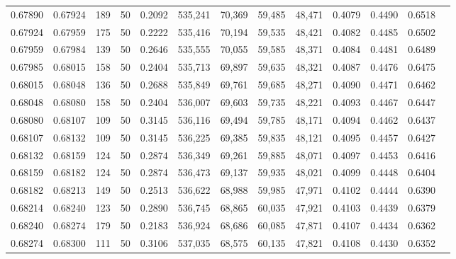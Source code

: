 \begin{tabular}{rrrrrrrrrrrrr}
0.67890 & 0.67924 &   189 &  50 &                                     0.2092 & 535,241 &  70,369 &  59,485 &  48,471 & 0.4079 & 0.4490 & 0.6518 \\
0.67924 & 0.67959 &   175 &  50 &                                     0.2222 & 535,416 &  70,194 &  59,535 &  48,421 & 0.4082 & 0.4485 & 0.6502 \\
0.67959 & 0.67984 &   139 &  50 &                                     0.2646 & 535,555 &  70,055 &  59,585 &  48,371 & 0.4084 & 0.4481 & 0.6489 \\
0.67985 & 0.68015 &   158 &  50 &                                     0.2404 & 535,713 &  69,897 &  59,635 &  48,321 & 0.4087 & 0.4476 & 0.6475 \\
0.68015 & 0.68048 &   136 &  50 &                                     0.2688 & 535,849 &  69,761 &  59,685 &  48,271 & 0.4090 & 0.4471 & 0.6462 \\
0.68048 & 0.68080 &   158 &  50 &                                     0.2404 & 536,007 &  69,603 &  59,735 &  48,221 & 0.4093 & 0.4467 & 0.6447 \\
0.68080 & 0.68107 &   109 &  50 &                                     0.3145 & 536,116 &  69,494 &  59,785 &  48,171 & 0.4094 & 0.4462 & 0.6437 \\
0.68107 & 0.68132 &   109 &  50 &                                     0.3145 & 536,225 &  69,385 &  59,835 &  48,121 & 0.4095 & 0.4457 & 0.6427 \\
0.68132 & 0.68159 &   124 &  50 &                                     0.2874 & 536,349 &  69,261 &  59,885 &  48,071 & 0.4097 & 0.4453 & 0.6416 \\
0.68159 & 0.68182 &   124 &  50 &                                     0.2874 & 536,473 &  69,137 &  59,935 &  48,021 & 0.4099 & 0.4448 & 0.6404 \\
0.68182 & 0.68213 &   149 &  50 &                                     0.2513 & 536,622 &  68,988 &  59,985 &  47,971 & 0.4102 & 0.4444 & 0.6390 \\
0.68214 & 0.68240 &   123 &  50 &                                     0.2890 & 536,745 &  68,865 &  60,035 &  47,921 & 0.4103 & 0.4439 & 0.6379 \\
0.68240 & 0.68274 &   179 &  50 &                                     0.2183 & 536,924 &  68,686 &  60,085 &  47,871 & 0.4107 & 0.4434 & 0.6362 \\
0.68274 & 0.68300 &   111 &  50 &                                     0.3106 & 537,035 &  68,575 &  60,135 &  47,821 & 0.4108 & 0.4430 & 0.6352 \\

\end{tabular}
